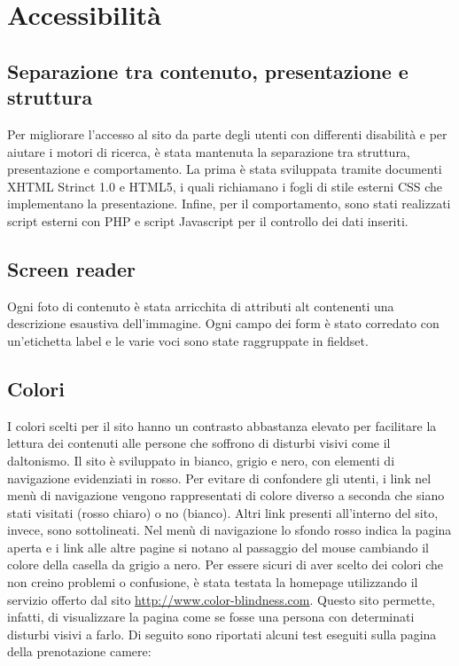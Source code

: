 \section{Accessibilità}
\subsection{Separazione tra contenuto, presentazione e struttura}
Per migliorare l'accesso al sito da parte degli utenti con differenti disabilità e per aiutare i motori di ricerca, è stata mantenuta la separazione tra struttura, presentazione e comportamento.
La prima è stata sviluppata tramite documenti XHTML Strinct 1.0 e HTML5, i quali richiamano i fogli di stile esterni CSS che implementano la presentazione.
Infine, per il comportamento, sono stati realizzati script esterni con PHP e script Javascript per il controllo dei dati inseriti.
\subsection{Screen reader}
Ogni foto di contenuto è stata arricchita di attributi alt contenenti una descrizione esaustiva dell'immagine.
Ogni campo dei form è stato corredato con un'etichetta label e le varie voci sono state raggruppate in fieldset.
\subsection{Colori}
I colori scelti per il sito hanno un contrasto abbastanza elevato per facilitare la lettura dei contenuti alle persone che soffrono di disturbi visivi come il daltonismo.
Il sito è sviluppato in bianco, grigio e nero, con elementi di navigazione evidenziati in rosso.
Per evitare di confondere gli utenti, i link nel menù di navigazione vengono rappresentati di colore diverso a seconda che siano stati visitati (rosso chiaro) o no (bianco). Altri link presenti all'interno del sito, invece, sono sottolineati.
Nel menù di navigazione lo sfondo rosso indica la pagina aperta e i link alle altre pagine si notano al passaggio del mouse cambiando il colore della casella da grigio a nero.
Per essere sicuri di aver scelto dei colori che non creino problemi o confusione, è stata testata la homepage utilizzando il servizio offerto dal sito \underline{\color{Blue}http://www.color-blindness.com}.
Questo sito permette, infatti, di visualizzare la pagina come se fosse una persona con determinati disturbi visivi a farlo.
Di seguito sono riportati alcuni test eseguiti sulla pagina della prenotazione camere:

